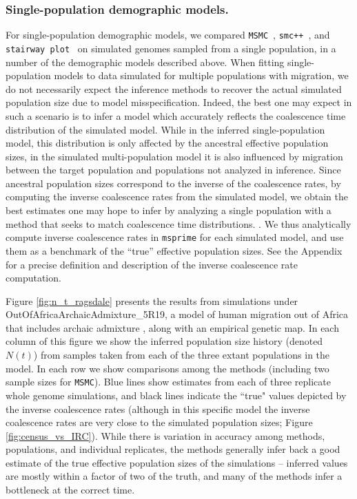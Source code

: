\documentclass[12pt,halfline,a4paper]{ouparticle}
\newcommand{\MSMC}{\texttt{MSMC}\xspace}
\newcommand{\smcpp}{\texttt{smc++}\xspace}
\newcommand{\stairwayplot}{\texttt{stairway plot}\xspace}
\begin{document}
\subsubsection*{ Single-population demographic models.}
For single-population demographic models, we compared
\MSMC~\citep{schiffels2014inferring}, \smcpp~\citep{terhorst2017robust}, and
\stairwayplot~\citep{liu2015exploring}
 on simulated genomes sampled from a single population,
in a number of the demographic models described above.
When fitting single-population models to data simulated for multiple
populations with migration, we do not necessarily expect the inference methods to recover the
actual simulated population size due to model misspecification.
Indeed, the best one may expect in such a scenario is to infer a model which accurately reflects the
coalescence time distribution of the simulated model. While in the inferred single-population model,
this distribution is only affected by the ancestral effective population sizes, in the simulated multi-population
model it is also influenced by migration between the target population and populations not analyzed in inference.
Since ancestral population sizes correspond to the inverse of the coalescence rates, by computing the
inverse coalescence rates from the simulated model, we obtain the best estimates
one may hope to infer by analyzing a single population with a method that seeks to match coalescence time distributions.
. We thus analytically compute inverse coalescence
rates in \texttt{msprime} for each simulated model, and use them as a benchmark of the ``true'' effective population sizes.
See the Appendix for a precise definition and description of the inverse coalescence rate computation.

Figure \ref{fig:n_t_ragsdale} presents the results
from simulations under OutOfAfricaArchaicAdmixture\_5R19,
a model of human migration out of Africa that includes archaic admixture
\citep{ragsdale2019models}, along with an empirical genetic map. In each column of this figure
we show the inferred population size history (denoted $N(t)$)
from samples taken from each of the three extant populations in the model.
In each row we show comparisons among the methods (including two sample sizes for \MSMC).
Blue lines show estimates from each of three replicate whole genome simulations,
and black lines indicate the ``true" values depicted by the inverse coalescence rates (although in this specific model
the inverse coalescence rates are very close to the simulated population sizes;
Figure \ref{fig:census_vs_IRC}).
While there is variation in accuracy among methods, populations, and individual replicates,
the methods generally infer back a good estimate
of the true effective population sizes of the simulations --
inferred values are mostly within a factor of two of the truth,
and many of the methods infer a bottleneck at the correct time.
\end{document}
